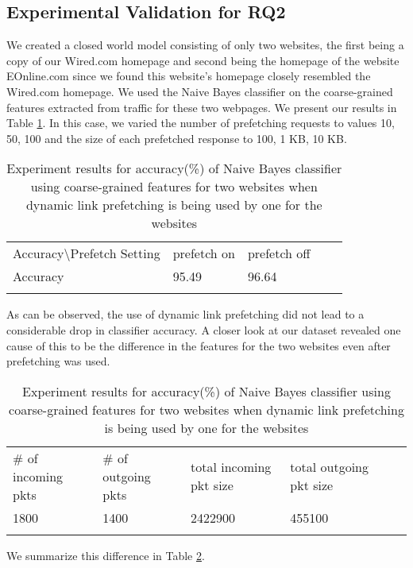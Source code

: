 \subsection{Experimental Validation for RQ2}
We created a closed world model consisting of only two websites, the first being a copy of our Wired.com homepage\cite{tj-wired} and second being the homepage of the website EOnline.com\cite{eonline} since we found this website's homepage closely resembled the Wired.com homepage. 
We used the Naive Bayes classifier on the coarse-grained features extracted from traffic for these two webpages. 
We present our results in Table \ref{table:rq2-nb}. 
In this case, we varied the number of prefetching requests to values 10, 50, 100 and the size of each prefetched response to 100, 1 KB, 10 KB. 

\begin{table}[]
\centering
\caption{Experiment results for accuracy(\%) of Naive Bayes classifier using coarse-grained features for two websites when dynamic link prefetching is being used by one for the websites}
\label{table:rq2-nb}
\begin{tabular}{lllll}
\cline{1-3}
\multicolumn{1}{|l|}{Accuracy\textbackslash Prefetch Setting} & \multicolumn{1}{l|}{prefetch on} & \multicolumn{1}{l|}{prefetch off} &  &  \\ \cline{1-3}
\multicolumn{1}{|l|}{Accuracy}                    & \multicolumn{1}{l|}{95.49}         & \multicolumn{1}{l|}{96.64}          &  &  \\ \cline{1-3}
                                                     &                                  &                                   &  & 
\end{tabular}                  
\end{table}

As can be observed, the use of dynamic link prefetching did not lead to a considerable drop in classifier accuracy. 
A closer look at our dataset revealed one cause of this to be the difference in the features for the two websites even after prefetching was used. 

\begin{table}[]
\centering
\caption{Experiment results for accuracy(\%) of Naive Bayes classifier using coarse-grained features for two websites when dynamic link prefetching is being used by one for the websites}
\label{table:rq2-diff}
\begin{tabular}{llllll}
\cline{1-4}
\multicolumn{1}{|l|}{\# of incoming pkts} & \multicolumn{1}{l|}{\# of outgoing pkts} & \multicolumn{1}{l|}{total incoming pkt size} & \multicolumn{1}{l|}{total outgoing pkt size} &  &  \\ \cline{1-4}
\multicolumn{1}{|l|}{1800}         & \multicolumn{1}{l|}{1400}  & \multicolumn{1}{l|}{2422900}  & \multicolumn{1}{l|}{455100}      &  &  \\ \cline{1-4}
                                          &              &                                  &                                   &  & 
\end{tabular}                  
\end{table}



We summarize this difference in Table \ref{table:rq2-diff}.
%

